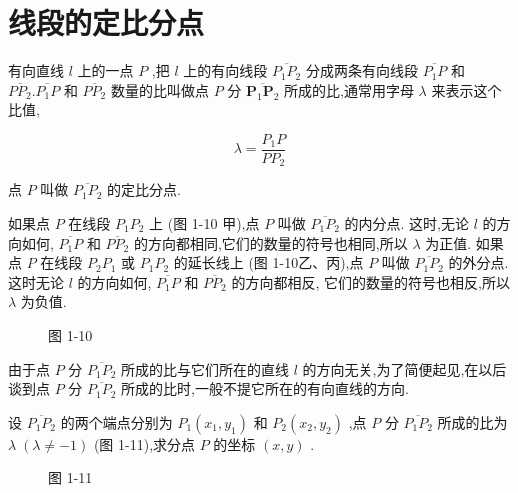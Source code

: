 \documentclass[lang=cn,newtx,10.5pt,scheme=chinese]{elegantbook}
\begin{document}
\section{线段的定比分点}

\begin{definition}[定比分点] \label{def:int}
	
有向直线 \(l\) 上的一点 \(P\) ,把 \(l\) 上的有向线段 \(\overline{{P}_{1}{P}_{2}}\) 分成两条有向线段 \(\overline{{P}_{1}P}\) 和 \(\overline{P{P}_{2}}.\overline{{P}_{1}P}\) 和 \(\overline{P{P}_{2}}\) 数量的比叫做点 \(P\) 分 \(\overline{{\mathbf{P}}_{1}{\mathbf{P}}_{2}}\) 所成的比,通常用字母 \(\lambda\) 来表示这个比值,

\[
  \lambda = \frac{{P}_{1}P}{P{P}_{2}}
\]

点 \(P\) 叫做 \(\overline{{P}_{1}{P}_{2}}\) 的定比分点.
\end{definition}

\begin{corollary}[内外分点]
如果点 \(P\) 在线段 \({P}_{1}{P}_{2}\) 上 (图 1-10 甲),点 \(P\) 叫做 \(\overline{{P}_{1}{P}_{2}}\) 的内分点. 这时,无论 \(l\) 的方向如何, \(\overline{{P}_{1}P}\) 和 \(\overline{P{P}_{2}}\) 的方向都相同,它们的数量的符号也相同,所以 \(\lambda\) 为正值. 如果点 \(P\) 在线段 \({P}_{2}{P}_{1}\) 或 \({P}_{1}{P}_{2}\) 的延长线上 (图 1-10乙、丙),点 \(P\) 叫做 \(\overline{{P}_{1}{P}_{2}}\) 的外分点. 这时无论 \(l\) 的方向如何, \(\overline{{P}_{1}P}\) 和 \(\overline{P{P}_{2}}\) 的方向都相反, 它们的数量的符号也相反,所以 \(\lambda\) 为负值.
\end{corollary}

\begin{figure}[h]
  \centering
  
  \caption{图 1-10}
\end{figure}

由于点 \(P\) 分 \(\overline{{P}_{1}{P}_{2}}\) 所成的比与它们所在的直线 \(l\) 的方向无关,为了简便起见,在以后谈到点 \(P\) 分 \(\overline{{P}_{1}{P}_{2}}\) 所成的比时,一般不提它所在的有向直线的方向.

设 \(\overline{{P}_{1}{P}_{2}}\) 的两个端点分别为 \({P}_{1}\left( {{x}_{1},{y}_{1}}\right)\) 和 \({P}_{2}\left( {{x}_{2},{y}_{2}}\right)\) ,点 \(P\) 分 \(\overline{{P}_{1}{P}_{2}}\) 所成的比为 \(\lambda \;\left( {\lambda \neq - 1}\right)\) (图 1-11),求分点 \(P\) 的坐标 \(\left( {x,y}\right)\) .

\begin{figure}[h]
	\centering
	
	\caption{图 1-11}
\end{figure}
\end{document}
